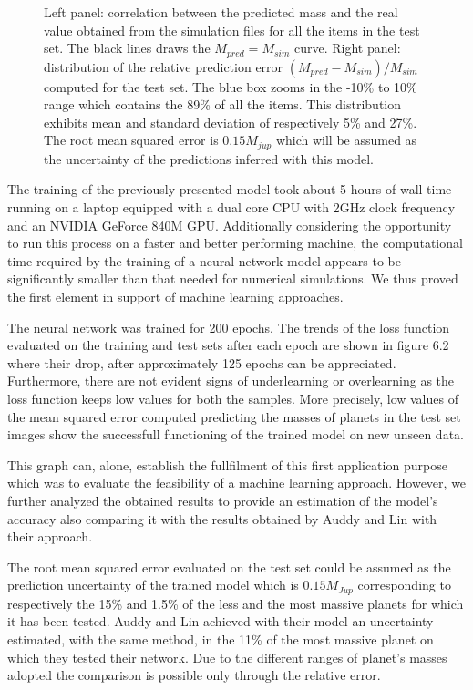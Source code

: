 \documentclass[a4paper,10pt]{report}
\begin{document}
\begin{figure}
    \begin{center}
        \scalebox{0.85}{}
    \end{center}
    \caption{Left panel: correlation between the predicted mass and the real value obtained from the simulation files
    for all the items in the test set. The black lines draws the $M_{pred} = M_{sim}$ curve.
    Right panel: distribution of the relative prediction error $(M_{pred} - M_{sim})/M_{sim}$ 
        computed for the test set. The blue box 
    zooms in the -10\% to 10\% range which contains the 89\% of all the items. This distribution exhibits mean and standard 
    deviation of respectively 5\% and 27\%. The root mean squared error is $0.15 M_{jup}$ which will be assumed
    as the uncertainty of the predictions inferred with this model.}
\end{figure}

The training of the previously presented model took about 5 hours of wall time running on a laptop equipped with a dual core CPU
with 2GHz clock frequency and an NVIDIA GeForce 840M GPU. Additionally considering the opportunity to run
this process on a faster and better performing machine, the computational time required by the training of a neural network
model appears to be significantly smaller than that needed for numerical simulations. We thus proved the
first element in support of machine learning approaches.

The neural network was trained for 200 epochs. The trends of the loss function evaluated on the training and test sets after each epoch are shown
in figure 6.2 where their drop, after approximately 125 epochs can be appreciated.
Furthermore, there are not evident signs of underlearning or overlearning as the loss function keeps low values for both the samples.
More precisely, low values of the mean squared error computed predicting the masses of planets in the test set images 
show the successfull functioning of the trained model on new unseen data.

This graph can, alone, establish the fullfilment of this first application purpose which was to evaluate the feasibility of
a machine learning approach. However, we further analyzed the obtained results to provide 
an estimation of the model's accuracy also comparing it with the results obtained by Auddy and Lin with their
approach. 

The root mean squared error evaluated on the test set could be assumed as the
prediction uncertainty of the trained model which is $0.15 M_{Jup}$ corresponding to respectively
the 15\% and 1.5\% of the less and the most massive planets
for which it has been tested. Auddy and Lin achieved with their model an uncertainty estimated, with the same method,
in the 11\% 
of the most massive planet on which they tested their network. 
Due to the different ranges of planet's masses adopted the comparison is possible only through the relative error.
\end{document}
